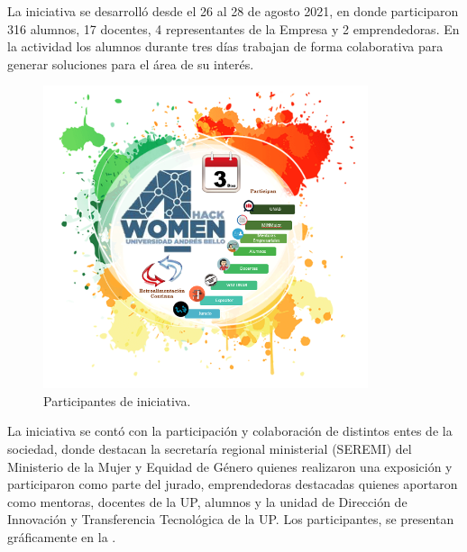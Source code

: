 \documentclass[spanish]{textolivre}
\begin{document}
La iniciativa se desarrolló desde el 26 al 28 de agosto 2021, en donde participaron 316 alumnos, 17 docentes, 4 representantes de la Empresa y 2 emprendedoras. En la actividad los alumnos durante tres días trabajan de forma colaborativa para generar soluciones para el área de su interés.

\begin{figure}[h!]
 \centering
 \includegraphics[width=0.85\textwidth]{images/figura3.png}
 \caption{Participantes de iniciativa.}
 \label{fig03}
\end{figure}

La iniciativa se contó con la participación y colaboración de distintos entes de la sociedad, donde destacan la secretaría regional ministerial (SEREMI) del Ministerio de la Mujer y Equidad de Género quienes realizaron una exposición y participaron como parte del jurado, emprendedoras destacadas quienes aportaron como mentoras, docentes de la UP, alumnos y la unidad de Dirección de Innovación y Transferencia Tecnológica de la UP. 
Los participantes, se presentan gráficamente en la .
\end{document}
